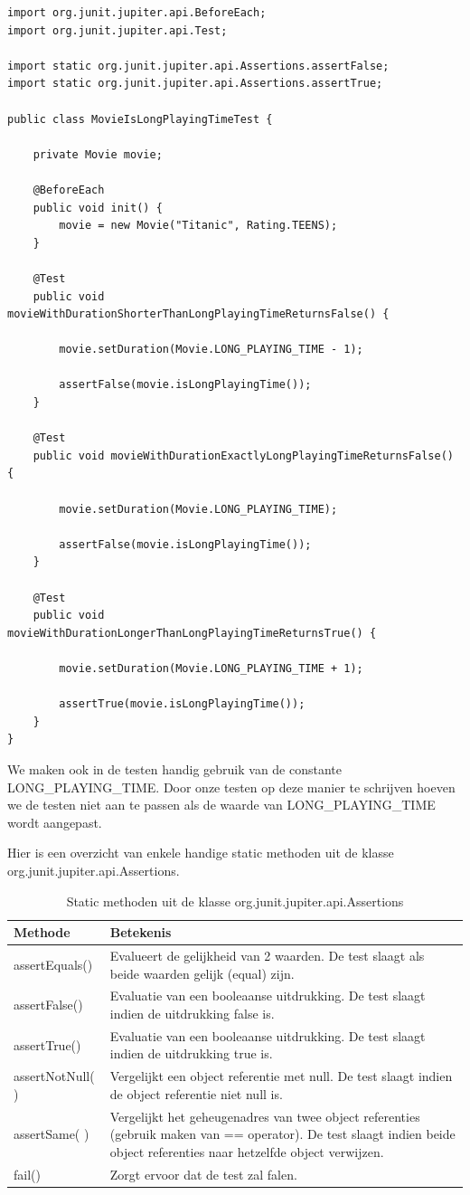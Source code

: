 \documentclass{tstextbook}
\begin{document}
\begin{lstlisting}
import org.junit.jupiter.api.BeforeEach;
import org.junit.jupiter.api.Test;

import static org.junit.jupiter.api.Assertions.assertFalse;
import static org.junit.jupiter.api.Assertions.assertTrue;

public class MovieIsLongPlayingTimeTest {

	private Movie movie;

	@BeforeEach
	public void init() {
		movie = new Movie("Titanic", Rating.TEENS);
	}

	@Test
	public void movieWithDurationShorterThanLongPlayingTimeReturnsFalse() {

		movie.setDuration(Movie.LONG_PLAYING_TIME - 1);

		assertFalse(movie.isLongPlayingTime());
	}

	@Test
	public void movieWithDurationExactlyLongPlayingTimeReturnsFalse() {

		movie.setDuration(Movie.LONG_PLAYING_TIME);

		assertFalse(movie.isLongPlayingTime());
	}

	@Test
	public void movieWithDurationLongerThanLongPlayingTimeReturnsTrue() {

		movie.setDuration(Movie.LONG_PLAYING_TIME + 1);

		assertTrue(movie.isLongPlayingTime());
	}
}
\end{lstlisting}

We maken ook in de testen handig gebruik van de constante LONG\_PLAYING\_TIME. Door onze testen op deze manier te schrijven hoeven we de testen niet aan te passen als de waarde van LONG\_PLAYING\_TIME wordt aangepast. 

Hier is een overzicht van enkele handige static methoden uit de klasse org.junit.jupiter.api.Assertions. 

\begin{table}[h!]
\centering
\begin{tabularx}{\textwidth}{| l | X |}
 \hline
 Methode & Betekenis\\ 
 \hline\hline
assertEquals() & Evalueert de gelijkheid van 2 waarden. De test slaagt als beide
waarden gelijk (equal) zijn.\\
\hline
assertFalse() & Evaluatie van een booleaanse uitdrukking. De test slaagt indien
de uitdrukking false is.\\
\hline
assertTrue() & Evaluatie van een booleaanse uitdrukking. De test slaagt indien
de uitdrukking true is.\\
\hline
assertNotNull( ) & Vergelijkt een object referentie met null. De test slaagt indien de
object referentie niet null is.\\
\hline
assertSame( ) & Vergelijkt het geheugenadres van twee object referenties
(gebruik maken van == operator). De test slaagt indien beide
object referenties naar hetzelfde object verwijzen.\\
\hline
fail() & Zorgt ervoor dat de test zal falen.\\
 \hline
\end{tabularx}
\caption{Static methoden uit de klasse org.junit.jupiter.api.Assertions}
\label{table:assertions}
\end{table}
\end{document}
